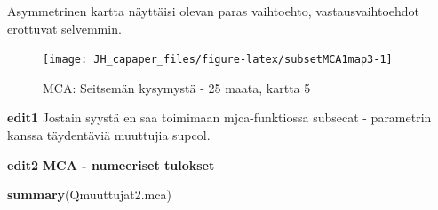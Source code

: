 \documentclass[
  finnish,
]{book}
\newenvironment{Shaded}{\begin{snugshade}}{\end{snugshade}}
\newcommand{\KeywordTok}[1]{\textcolor[rgb]{0.13,0.29,0.53}{\textbf{#1}}}
\newcommand{\NormalTok}[1]{#1}
\begin{document}
Asymmetrinen kartta näyttäisi olevan paras vaihtoehto, vastausvaihtoehdot erottuvat selvemmin.

\begin{figure}

{\centering \texttt{[image: JH\_capaper\_files/figure-latex/subsetMCA1map3-1]} 

}

\caption{MCA: Seitsemän kysymystä - 25 maata, kartta 5}\label{fig:subsetMCA1map3}
\end{figure}

\textbf{edit1} Jostain syystä en saa toimimaan mjca-funktiossa subsecat - parametrin kanssa
täydentäviä muuttujia supcol.

\textbf{edit2}
\textbf{MCA - numeeriset tulokset}

\begin{Shaded}
\begin{Highlighting}[]
\KeywordTok{summary}\NormalTok{(Qmuuttujat2.mca)}
\end{Highlighting}
\end{Shaded}
\end{document}
